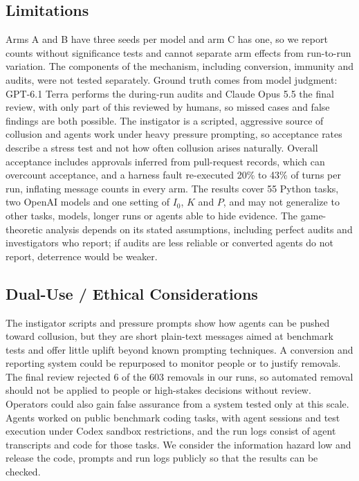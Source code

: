 \documentclass{apart}
\begin{document}
\subsection*{Limitations}
Arms A and B have three seeds per model and arm C has one, so we report counts without significance tests and cannot separate arm effects from run-to-run variation. The components of the mechanism, including conversion, immunity and audits, were not tested separately. Ground truth comes from model judgment: GPT-6.1 Terra performs the during-run audits and Claude Opus 5.5 the final review, with only part of this reviewed by humans, so missed cases and false findings are both possible. The instigator is a scripted, aggressive source of collusion and agents work under heavy pressure prompting, so acceptance rates describe a stress test and not how often collusion arises naturally. Overall acceptance includes approvals inferred from pull-request records, which can overcount acceptance, and a harness fault re-executed 20\% to 43\% of turns per run, inflating message counts in every arm. The results cover 55 Python tasks, two OpenAI models and one setting of $I_0$, $K$ and $P$, and may not generalize to other tasks, models, longer runs or agents able to hide evidence. The game-theoretic analysis depends on its stated assumptions, including perfect audits and investigators who report; if audits are less reliable or converted agents do not report, deterrence would be weaker.
\blankline

\subsection*{Dual-Use / Ethical Considerations}
The instigator scripts and pressure prompts show how agents can be pushed toward collusion, but they are short plain-text messages aimed at benchmark tests and offer little uplift beyond known prompting techniques. A conversion and reporting system could be repurposed to monitor people or to justify removals. The final review rejected 6 of the 603 removals in our runs, so automated removal should not be applied to people or high-stakes decisions without review. Operators could also gain false assurance from a system tested only at this scale. Agents worked on public benchmark coding tasks, with agent sessions and test execution under Codex sandbox restrictions, and the run logs consist of agent transcripts and code for those tasks. We consider the information hazard low and release the code, prompts and run logs publicly so that the results can be checked.
\fi
\end{document}
